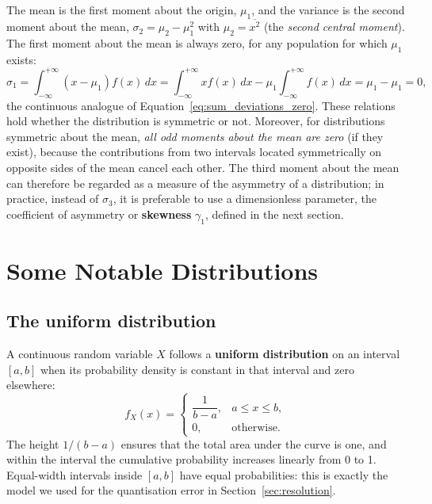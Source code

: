 \documentclass[letterpaper,11pt,leqno]{book}
\begin{document}
The mean is the first moment about the origin, $\mu_1$, and the variance is the second moment about the mean, $\sigma_2 = \mu_2 - \mu_1^2$ with $\mu_2 = \overline{x^2}$ (the \emph{second central moment}). The first moment about the mean is always zero, for any population for which $\mu_1$ exists:
\begin{equation}
\sigma_1 = \int_{-\infty}^{+\infty}(x - \mu_1)f(x)\,dx = \int_{-\infty}^{+\infty}xf(x)\,dx - \mu_1\int_{-\infty}^{+\infty}f(x)\,dx = \mu_1 - \mu_1 = 0,
\end{equation}
the continuous analogue of Equation~\eqref{eq:sum_deviations_zero}. These relations hold whether the distribution is symmetric or not. Moreover, for distributions symmetric about the mean, \emph{all odd moments about the mean are zero} (if they exist), because the contributions from two intervals located symmetrically on opposite sides of the mean cancel each other. The third moment about the mean can therefore be regarded as a measure of the asymmetry of a distribution; in practice, instead of $\sigma_3$, it is preferable to use a dimensionless parameter, the coefficient of asymmetry or \textbf{skewness} $\gamma_1$, defined in the next section.

\section{Some Notable Distributions}
\label{sec:distributions}

\subsection{The uniform distribution}
\label{sec:uniform}

A continuous random variable $X$ follows a \textbf{uniform distribution} on an interval $[a, b]$ when its probability density is constant in that interval and zero elsewhere:
\begin{equation}
\boxed{f_X(x) = \begin{cases} \dfrac{1}{b - a}, & a \le x \le b, \\[1ex] 0, & \text{otherwise}. \end{cases}}
\label{eq:uniform_pdf}
\end{equation}
The height $1/(b - a)$ ensures that the total area under the curve is one, and within the interval the cumulative probability increases linearly from 0 to 1. Equal-width intervals inside $[a, b]$ have equal probabilities: this is exactly the model we used for the quantisation error in Section~\ref{sec:resolution}.
\end{document}
